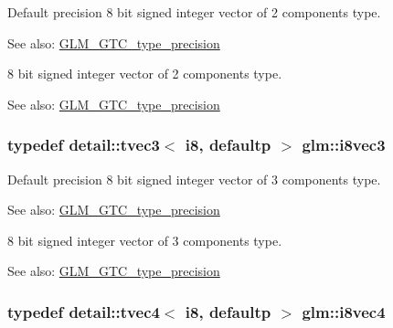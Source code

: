 Default precision 8 bit signed integer vector of 2 components type. \begin{Desc}
\item[See also:]\hyperlink{group__gtc__type__precision}{GLM\_\-GTC\_\-type\_\-precision}\end{Desc}
8 bit signed integer vector of 2 components type. \begin{Desc}
\item[See also:]\hyperlink{group__gtc__type__precision}{GLM\_\-GTC\_\-type\_\-precision} \end{Desc}
\hypertarget{group__gtc__type__precision_ge1e3127c58fbf1b6fbf28885cfd3dfad}{
\subsubsection[i8vec3]{\setlength{\rightskip}{0pt plus 5cm}typedef detail::tvec3$<$ i8, defaultp $>$ {\bf glm::i8vec3}}}
\label{group__gtc__type__precision_ge1e3127c58fbf1b6fbf28885cfd3dfad}


Default precision 8 bit signed integer vector of 3 components type. \begin{Desc}
\item[See also:]\hyperlink{group__gtc__type__precision}{GLM\_\-GTC\_\-type\_\-precision}\end{Desc}
8 bit signed integer vector of 3 components type. \begin{Desc}
\item[See also:]\hyperlink{group__gtc__type__precision}{GLM\_\-GTC\_\-type\_\-precision} \end{Desc}
\hypertarget{group__gtc__type__precision_g89bb5e6481ae11fb2599b71e36a390bb}{
\subsubsection[i8vec4]{\setlength{\rightskip}{0pt plus 5cm}typedef detail::tvec4$<$ i8, defaultp $>$ {\bf glm::i8vec4}}}
\label{group__gtc__type__precision_g89bb5e6481ae11fb2599b71e36a390bb}


